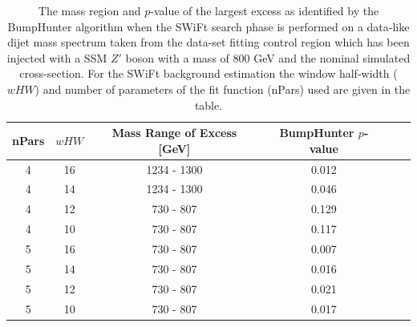 \begin{table}[!ht]
\centering
\begin{tabular}{|c|c||c|c|c|c|}
  \hline
  nPars & $wHW$  &  Mass Range of Excess [GeV]  &  BumpHunter \mbox{$p$-value} \\
  \hline
   4    & 16   &  1234 - 1300 &  0.012 \\
   4    & 14   &  1234 - 1300 &  0.046 \\
   4    & 12   &   730 - 807  &  0.129 \\
   4    & 10   &   730 - 807  &  0.117 \\
  \hline
   5    & 16   &   730 - 807  &  0.007 \\
   5    & 14   &   730 - 807  &  0.016 \\
   5    & 12   &   730 - 807  &  0.021 \\
   5    & 10   &   730 - 807  &  0.017 \\
  \hline
\end{tabular}
\vspace{10pt}
\caption{\label{tab:bumpH_lm_sigInj_800}
The mass region and $p$-value of the largest excess as identified by the {\sc BumpHunter} algorithm
when the SWiFt search phase is performed on a data-like dijet mass spectrum taken from
the \lm{} data-set fitting control region which has been injected with a SSM $Z'$ boson with a mass of 800 GeV
and the nominal simulated cross-section.
For the SWiFt background estimation the window half-width ($wHW$)
and number of parameters of the fit function (nPars) used are given in the table.}
\end{table}

